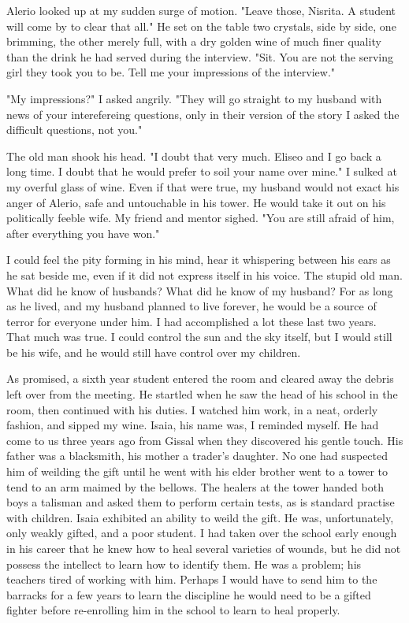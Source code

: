 \documentclass{article}
\begin{document}
Alerio looked up at my sudden surge of motion. "Leave those, Nisrita. A student will come by to clear that all." He set on the table  two crystals, side by side, one brimming, the other merely full, with a dry golden wine of much finer quality than the drink he had served during the interview. "Sit. You are not the serving girl they took you to be. Tell me your impressions of the interview."

"My impressions?" I asked angrily. "They will go straight to my husband with news of your interefereing questions, only in their version of the story I asked the difficult questions, not you."

The old man shook his head. "I doubt that very much. Eliseo and I go back a long time. I doubt that he would prefer to soil your name over mine." I sulked at my overful glass of wine. Even if that were true, my husband would not exact his anger of Alerio, safe and untouchable in his tower. He would take it out on his politically feeble wife. My friend and mentor sighed. "You are still afraid of him, after everything you have won." 

I could feel the pity forming in his mind, hear it whispering between his ears as he sat beside me, even if it did not express itself in his voice. The stupid old man. What did he know of husbands? What did he know of my husband? For as long as he lived, and my husband planned to live forever, he would be a source of terror for everyone under him. I had accomplished a lot these last two years. That much was true. I could control the sun and the sky itself, but I would still be his wife, and he would still have control over my children.

As promised, a sixth year student entered the room and cleared away the debris left over from the meeting. He startled when he saw the head of his school in the room, then continued with his duties. I watched him work, in a neat, orderly fashion, and sipped my wine. Isaia, his name was, I reminded myself. He had come to us three years ago from Gissal when they discovered his gentle touch. His father was a blacksmith, his mother a trader's daughter. No one had suspected him of weilding the gift until he went with his elder brother went to a tower to tend to an arm maimed by the bellows. The healers at the tower handed both boys a talisman and asked them to perform certain tests, as is standard practise with children. Isaia exhibited an ability to weild the gift. He was, unfortunately, only weakly gifted, and a poor student. I had taken over the school early enough in his career that he knew how to heal several varieties of wounds, but he did not possess the intellect to learn how to identify them. He was a problem; his teachers tired of working with him. Perhaps I would have to send him to the barracks for a few years to learn the discipline he would need to be a gifted fighter before re-enrolling him in the school to learn to heal properly. 
\end{document}
